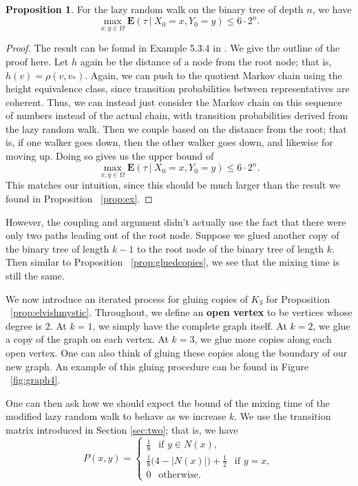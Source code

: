 \documentclass[10pt,a4paper]{amsart}
\theoremstyle{definition}
\numberwithin{definition}{section}
\newtheorem{proposition}[definition]{Proposition}
\begin{document}
\begin{proposition}\label{prop:binarylazyrw}
For the lazy random walk on the binary tree of depth $n$, we have 
\[ \max_{x,y \in \Omega} \mathbf{E}(\tau \ | \ X_0 = x, Y_0 = y) \leq 6 \cdot 2^n. \]
\end{proposition}

\begin{proof}
The result can be found in Example 5.3.4 in \cite{LevinPeresWilmer2006}. We give the outline of the proof here. Let $h$ again be the distance of a node from the root node; that is, $h(v) = \rho(v, v_*)$. Again, we can push to the quotient Markov chain using the height equivalence class, since transition probabilities between representatives are coherent. Thus, we can instead just consider the Markov chain on this sequence of numbers instead of the actual chain, with transition probabilities derived from the lazy random walk. Then we couple based on the distance from the root; that is, if one walker goes down, then the other walker goes down, and likewise for moving up. Doing so gives us the upper bound of 
\[ \max_{x,y \in \Omega} \mathbf{E}(\tau \ | \ X_0 = x, Y_0 =y) \leq 6 \cdot 2^n.\]
This matches our intuition, since this should be much larger than the result we found in Proposition ~\ref{prop:ex}.
\end{proof}

However, the coupling and argument didn't actually use the fact that there were only two paths leading out of the root node. Suppose we glued another copy of the binary tree of length $k-1$ to the root node of the binary tree of length $k$. Then similar to Proposition ~\ref{prop:gluedcopies}, we see that the mixing time is still the same. 

We now introduce an iterated process for gluing copies of $K_3$ for Proposition ~\ref{prop:elvishmystic}. Throughout, we define an \textbf{open vertex} to be vertices whose degree is $2$. At $k=1$, we simply have the complete graph itself. At $k=2$, we glue a copy of the graph on each vertex. At $k=3$, we glue more copies along each open vertex. One can also think of gluing these copies along the boundary of our new graph. An example of this gluing procedure can be found in Figure ~\ref{fig:graph4}.


One can then ask how we should expect the bound of the mixing time of the modified lazy random walk to behave as we increase $k$. We use the transition matrix introduced in Section \ref{sec:two}; that is, we have 
\[ P(x,y) = \begin{cases} \frac{1}{8} \ \ \text{ if } y \in N(x), \\
\frac{1}{8} \big(4 - |N(x)| \big) + \frac{1}{2} \ \ \text{ if } y = x,\\
0 \ \ \text{ otherwise.} 
\end{cases}\]
\end{document}
